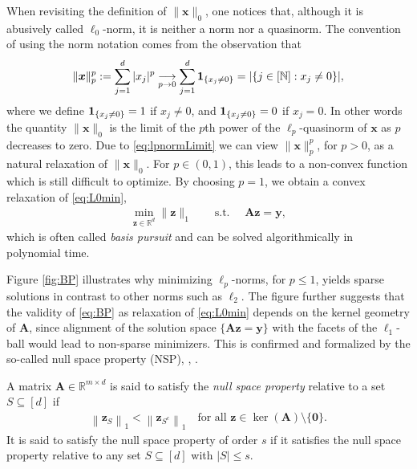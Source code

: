 \documentclass{svproc}
\newcommand{\bA}{\boldsymbol{A}}
\newcommand{\bx}{\boldsymbol{x}}
\newcommand{\by}{\boldsymbol{y}}
\newcommand{\bz}{\boldsymbol{z}}
\newcommand{\0}{\boldsymbol{0}}
\newcommand{\1}{\boldsymbol{1}}
\renewcommand{\subset}{\subseteq}
\def\N{\mathbb{N}}
\def\R{\mathbb{R}}
\newcommand{\pnorm}[2]{\left\| #1 \right\|_{#2}}
\begin{document}
When revisiting the definition of $\|\bx\|_0$, one notices that, although it is abusively called $\ell_0$-norm, it is neither a norm nor a quasinorm. The convention of using the norm notation 
comes from the observation that 
\begin{align}
    \label{eq:lpnormLimit}
\|\bx\|_p^p := \sum_{j=1}^d |x_j|^p \underset{p \to 0}{\longrightarrow} 
\sum_{j=1}^d {\bf 1}_{ \{x_j \not= 0 \}}
= | \{ j \in [\N]: x_j \not= 0 \} |,
\end{align}
where we define ${\bf 1}_{ \{x_j \not= 0 \}} = 1$ if $x_j \neq 0$, and ${\bf 1}_{ \{x_j \not= 0 \}} = 0$ if $x_j = 0$.
In other words the quantity $\|\bx\|_0$
is the limit of the $p$th power of the $\ell_p$-quasinorm of $\bx$ as $p$ decreases to zero. Due to \eqref{eq:lpnormLimit} we can view $\| \bx \|_p^p$, for $p > 0$, as a natural relaxation of $\| \bx \|_0$. For $p \in (0,1)$, this leads to a non-convex function which is still difficult to optimize. By choosing $p=1$, we obtain a convex relaxation of \eqref{eq:L0min}, 
\begin{align}
\label{eq:BP}
    \min_{\bz \in \R^d} \| \bz \|_1
    \qquad \text{s.t. } \quad \bA\bz = \by,
\end{align}
which is often called \emph{basis pursuit} and can be solved algorithmically in polynomial time. 

Figure \ref{fig:BP} illustrates why minimizing $\ell_p$-norms, for $p \le 1$, yields sparse solutions in contrast to other norms such as $\ell_2$. The figure further suggests that the validity of \eqref{eq:BP} as relaxation of \eqref{eq:L0min} depends on the kernel geometry of $\bA$, since alignment of the solution space $\{\bA\bz = \by\}$ with the facets of the $\ell_1$-ball would lead to non-sparse minimizers. This is confirmed and formalized by the so-called null space property (NSP), \cite{doel03,grni07,codade09}, \cite[Definition 4.1]{foucart2013mathematical}.

\begin{definition} \label{def:NSP}
    A matrix $\bA \in \R^{m\times d}$ is said to satisfy the \emph{null space property} relative to a set $S \subset [d]$ if
	\begin{align*}
		\pnorm{\bz_S}{1} < \pnorm{\bz_{S^c}}{1} \quad \text{for all } \bz \in \ker(\bA) \setminus \{ \0 \}.
	\end{align*}
	It is said to satisfy the null space property of order $s$ if it satisfies the null space
    property relative to any set $S \subset [d]$ with $|S| \le s$.
\end{definition}
\end{document}
